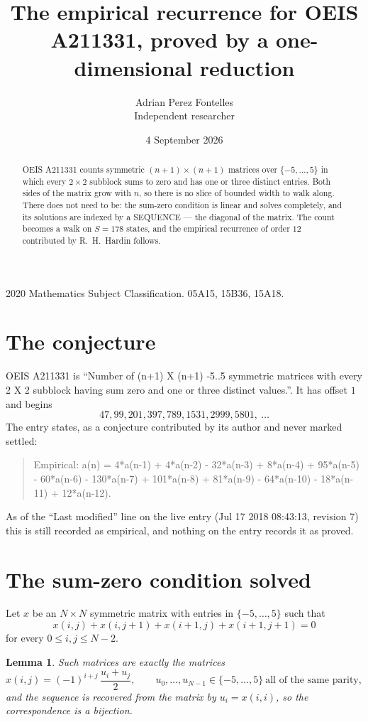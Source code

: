 \documentclass[11pt,a4paper]{article}
\title{The empirical recurrence for OEIS A211331, proved by a one-dimensional reduction}
\author{Adrian Perez Fontelles\\ \small Independent researcher}
\date{4 September 2026}
\theoremstyle{plain}
\newtheorem{lemma}[theorem]{Lemma}
\theoremstyle{definition}
\begin{document}
\maketitle

\begin{abstract}
OEIS A211331 counts symmetric $(n+1)\times(n+1)$ matrices over
$\{-5,\dots,5\}$ in which every $2\times2$ subblock sums to zero and has one or three distinct
entries. Both sides of the matrix grow with $n$, so there is no slice of bounded width to walk
along. There does not need to be: the sum-zero condition is linear and solves completely, and
its solutions are indexed by a SEQUENCE --- the diagonal of the matrix. The count becomes a walk
on $S=178$ states, and the empirical recurrence of order $12$ contributed by R.~H.~Hardin
follows.
\end{abstract}

\noindent\small 2020 Mathematics Subject Classification. 05A15, 15B36, 15A18.\normalsize

\section{The conjecture}

OEIS A211331 is ``Number of (n+1) X (n+1) -5..5 symmetric matrices with every 2 X 2 subblock having sum zero and one or three distinct values.''. It has offset $1$ and begins
\[
47, 99, 201, 397, 789, 1531, 2999, 5801,\ \dots
\]
The entry states, as a conjecture contributed by its author and never marked settled:
\begin{quote}
Empirical: a(n) = 4*a(n-1) + 4*a(n-2) - 32*a(n-3) + 8*a(n-4) + 95*a(n-5) - 60*a(n-6) - 130*a(n-7) + 101*a(n-8) + 81*a(n-9) - 64*a(n-10) - 18*a(n-11) + 12*a(n-12).
\end{quote}
As of the ``Last modified'' line on the live entry (Jul 17 2018 08:43:13, revision 7) this is still
recorded as empirical, and nothing on the entry records it as proved.

\section{The sum-zero condition solved}

Let $x$ be an $N\times N$ symmetric matrix with entries in $\{-5,\dots,5\}$ such that
\[
x(i,j)+x(i,j{+}1)+x(i{+}1,j)+x(i{+}1,j{+}1)=0
\]
for every $0\le i,j\le N-2$.

\begin{lemma}\label{lem:solve}
Such matrices are exactly the matrices
\[
x(i,j)=(-1)^{i+j}\,\frac{u_i+u_j}{2},
\qquad u_0,\dots,u_{N-1}\in\{-5,\dots,5\}\ \text{all of the same parity},
\]
and the sequence is recovered from the matrix by $u_i=x(i,i)$, so the correspondence is a
bijection.
\end{lemma}
\end{document}
